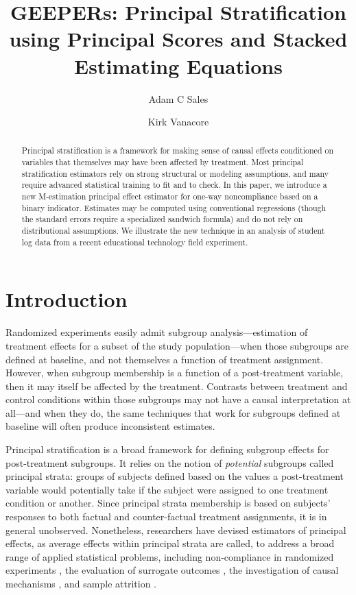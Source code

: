 \documentclass{statsoc} %
\title[GEEPERS]{GEEPERs: Principal Stratification using Principal Scores and Stacked Estimating Equations}
\author[Sales and Vanacore]{Adam C Sales}
\author{Kirk Vanacore}
\begin{document}
\maketitle

\begin{abstract}
Principal stratification is a framework for making sense of causal effects conditioned on variables that themselves may have been affected by treatment. Most principal stratification estimators rely on strong structural or modeling assumptions, and many require advanced statistical training to fit and to check. In this paper, we introduce a new M-estimation principal effect estimator for one-way noncompliance based on a binary indicator. Estimates may be computed using conventional regressions (though the standard errors require a specialized sandwich formula) and do not rely on distributional assumptions. We illustrate the new technique in an analysis of student log data from a recent educational technology field experiment.  
\end{abstract}

\section{Introduction}

Randomized experiments easily admit subgroup analysis---estimation of treatment effects for a subset of the study population---when those subgroups are defined at baseline, and not themselves a function of treatment assignment.
However, when subgroup membership is a function of a post-treatment variable, then it may itself be affected by the treatment.
Contrasts between treatment and control conditions within those subgroups may not have a causal interpretation at all---and when they do, the same techniques that work for subgroups defined at baseline %
will often produce inconsistent estimates.

Principal stratification \citep{frangakis} is a broad framework for defining subgroup effects for post-treatment subgroups. It relies on the notion of \emph{potential} subgroups called principal strata: groups of subjects defined based on the values a post-treatment variable would potentially take if the subject were assigned to one treatment condition or another.
Since principal strata membership is based on subjects' responses to both factual and counter-factual treatment assignments, it is in general unobserved.
Nonetheless, researchers have devised estimators of principal effects, as average effects within principal strata are called, to address a broad range of applied statistical problems, including non-compliance in randomized experiments \citep{air}, the evaluation of surrogate outcomes \citep{li2010bayesian}, the investigation of causal mechanisms \citep{lidsayPage}, and sample attrition \citep{zhangRubin, ding2011}.
\end{document}
